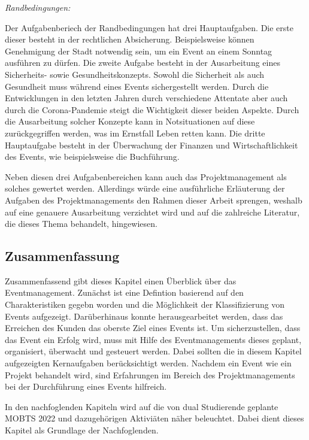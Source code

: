 \textit{Randbedingungen:}

Der Aufgabenberiech der Randbedingungen hat drei Hauptaufgaben.
Die erste dieser besteht in der rechtlichen Absicherung.
Beispielsweise können Genehmigung der Stadt notwendig sein, um ein Event an einem Sonntag ausführen zu dürfen.
Die zweite Aufgabe besteht in der Ausarbeitung eines Sicherheits- sowie Gesundheitskonzepts.
Sowohl die Sicherheit als auch Gesundheit muss während eines Events sichergestellt werden.
Durch die Entwicklungen in den letzten Jahren durch verschiedene Attentate aber auch durch die Corona-Pandemie steigt die Wichtigkeit dieser beiden Aspekte.
Durch die Ausarbeitung solcher Konzepte kann in Notsituationen auf diese zurückgegriffen werden, was im Ernstfall Leben retten kann.
Die dritte Hauptaufgabe besteht in der Überwachung der Finanzen und Wirtschaftlichkeit des Events, wie beispielsweise die Buchführung.\autocite[Vgl.][S. 169]{Holzbaur.2002}

Neben diesen drei Aufgabenbereichen kann auch das Projektmanagement als solches gewertet werden.
Allerdings würde eine ausführliche Erläuterung der Aufgaben des Projektmanagements den Rahmen dieser Arbeit sprengen, weshalb auf eine genauere Ausarbeitung verzichtet wird und auf die zahlreiche Literatur, die dieses Thema behandelt, hingewiesen.

\subsection{Zusammenfassung}
Zusammenfassend gibt dieses Kapitel einen Überblick über das Eventmanagement. 
Zunächst ist eine Defintion basierend auf den Charakteristiken gegebn worden und die Möglichkeit der Klassifizierung von Events aufgezeigt. 
Darüberhinaus konnte herausgearbeitet werden, dass das Erreichen des Kunden das oberste Ziel eines Events ist. 
Um sicherzustellen, dass das Event ein Erfolg wird, muss mit Hilfe des Eventmanagements dieses geplant, organisiert, überwacht und gesteuert werden.
Dabei sollten die in diesem Kapitel aufgezeigten Kernaufgaben berücksichtigt werden.  
Nachdem ein Event wie ein Projekt behandelt wird, sind Erfahrungen im Bereich des Projektmanagements bei der Durchführung eines Events hilfreich.

In den nachfoglenden Kapiteln wird auf die von dual Studierende geplante MOBTS 2022 und dazugehörigen Aktiviäten näher beleuchtet. Dabei dient dieses Kapitel als Grundlage der Nachfoglenden. 
